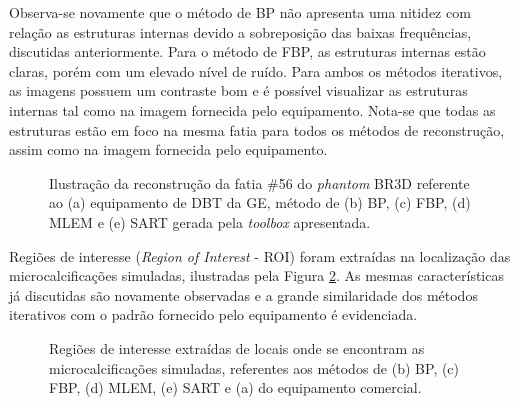 Observa-se novamente que o método de \acs{BP} não apresenta uma nitidez com relação as estruturas internas devido a sobreposição das baixas frequências, discutidas anteriormente. Para o método de \acs{FBP}, as estruturas internas estão claras, porém com um elevado nível de ruído. Para ambos os métodos iterativos, as imagens possuem um contraste bom e é possível visualizar as estruturas internas tal como na imagem fornecida pelo equipamento. Nota-se que todas as estruturas estão em foco na mesma fatia para todos os métodos de reconstrução, assim como na imagem fornecida pelo equipamento.

\begin{figure}[!h]
	\centering	
	\caption{Ilustração da reconstrução da fatia \#56 do \textit{phantom} BR3D referente ao (a) equipamento de \acs{DBT} da \acs{GE}, método de (b) \acs{BP}, (c) \acs{FBP}, (d) \acs{MLEM} e (e) \acs{SART} gerada pela \textit{toolbox} apresentada.}
	\hfill
	\hfill
	
	\hfil
	\label{fig:imgCap6BR3D}
\end{figure}

Regiões de interesse (\textit{Region of Interest} - \acs{ROI}) foram extraídas na localização das microcalcificações simuladas, ilustradas pela Figura \ref{fig:imgCap6BR3D_ROI}. As mesmas características já discutidas são novamente observadas e a grande similaridade dos métodos iterativos com o padrão fornecido pelo equipamento é evidenciada.

\begin{figure}[!h]
	\centering
	\caption{Regiões de interesse extraídas de locais onde se encontram as microcalcificações simuladas, referentes aos métodos de (b) \acs{BP}, (c) \acs{FBP}, (d) \acs{MLEM}, (e) \acs{SART} e (a) do equipamento comercial.}	
	\hfill
	\hfill
	\hfill
	\hfill
	\label{fig:imgCap6BR3D_ROI}
\end{figure}


